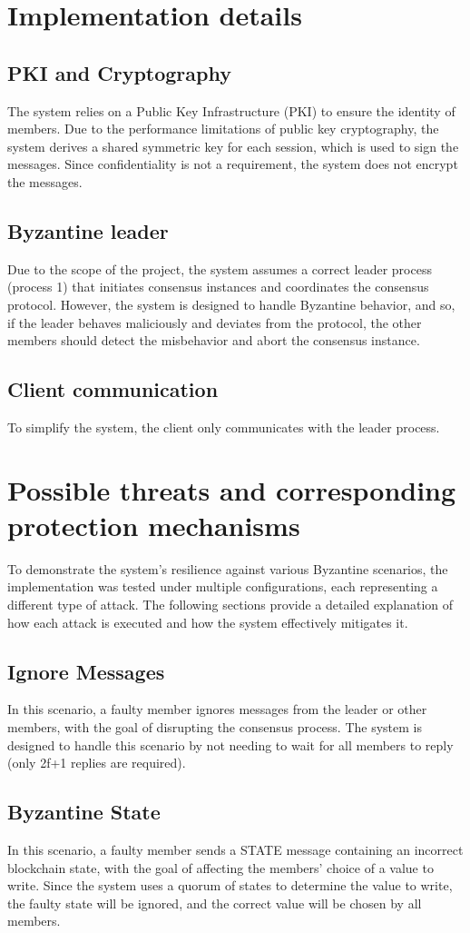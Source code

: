 \documentclass[runningheads]{llncs}
\begin{document}
%
\section{Implementation details}
\subsection{PKI and Cryptography}
The system relies on a Public Key Infrastructure (PKI) to ensure the identity of
members. Due to the performance limitations of public key cryptography, the
system derives a shared symmetric key for each session, which is used to sign
the messages. Since confidentiality is not a requirement, the system does not
encrypt the messages.
%
\subsection{Byzantine leader}
Due to the scope of the project, the system assumes a correct leader process
(process 1) that initiates consensus instances and coordinates the consensus
protocol. However, the system is designed to handle Byzantine behavior, and so,
if the leader behaves maliciously and deviates from the protocol, the other
members should detect the misbehavior and abort the consensus instance.
%
\subsection{Client communication}
To simplify the system, the client only communicates with the leader process.
%
\section{Possible threats and corresponding protection mechanisms}
To demonstrate the system's resilience against various Byzantine scenarios, the
implementation was tested under multiple configurations, each representing a
different type of attack. The following sections provide a detailed explanation
of how each attack is executed and how the system effectively mitigates it.
%
\subsection{Ignore Messages}
In this scenario, a faulty member ignores messages from the leader or other
members, with the goal of disrupting the consensus process. The system is
designed to handle this scenario by not needing to wait for all members to reply
(only 2f+1 replies are required).
%
\subsection{Byzantine State}
In this scenario, a faulty member sends a STATE message containing an incorrect
blockchain state, with the goal of affecting the members' choice of a value to write.
Since the system uses a quorum of states to determine the value to write, the
faulty state will be ignored, and the correct value will be chosen by all members.
%
\end{document}
